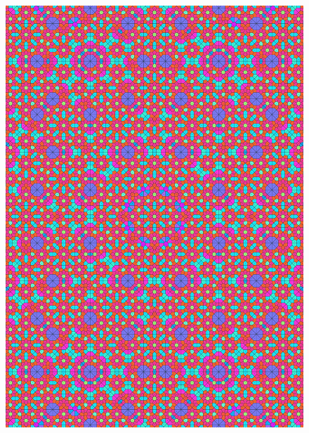 \documentclass[text.tex]{subfiles}
\begin{document}
\begin{figure}[h!]
\centering
\includegraphics[width=1\textwidth]{img/results/circle8/quasi_circle_122503_(2273_-941alpha_1).pdf}
\end{figure}
\end{document}
